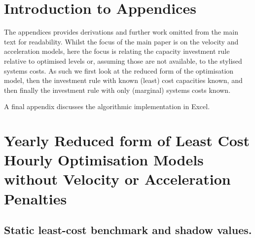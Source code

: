 \documentclass[preprint,authoryear,12pt]{elsarticle}
\begin{document}
\newpage
\appendix

\newpage
\section*{Introduction to Appendices}
The appendices provides derivations and further work omitted from the main text for readability. Whilst the focus of the main paper is on the velocity and acceleration models, here the focus is relating the capacity investment rule relative to optimised levels or, assuming those are not available, to the stylised systems costs. As such we first look at the reduced form of the optimisation model, then the investment rule with known (least) cost capacities known, and then finally the investment rule with only (marginal) systems costs known.

A final appendix discusses the algorithmic implementation in Excel.


\section{Yearly Reduced form of Least Cost Hourly Optimisation Models without Velocity or Acceleration Penalties}


\subsection{Static least-cost benchmark and shadow values.}
\end{document}
